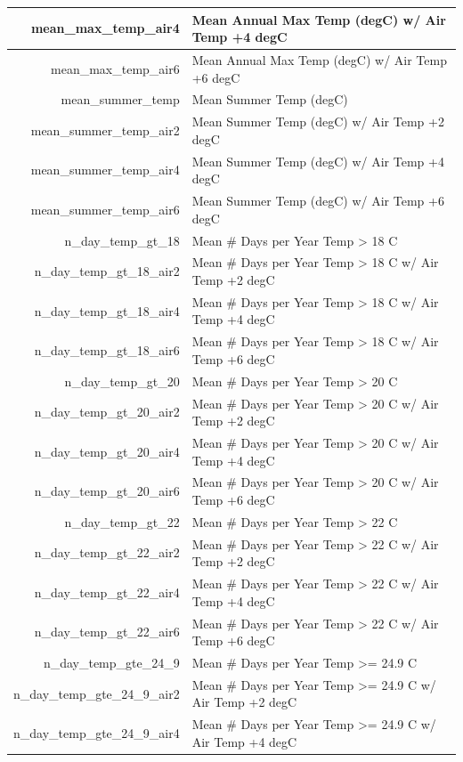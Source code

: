 \documentclass[]{book}
\begin{document}
\begin{tabular}{r|l}
\hline
mean\_max\_temp\_air4 & Mean Annual Max Temp (degC) w/ Air Temp +4 degC\\
\hline
mean\_max\_temp\_air6 & Mean Annual Max Temp (degC) w/ Air Temp +6 degC\\
\hline
mean\_summer\_temp & Mean Summer Temp (degC)\\
\hline
mean\_summer\_temp\_air2 & Mean Summer Temp (degC) w/ Air Temp +2 degC\\
\hline
mean\_summer\_temp\_air4 & Mean Summer Temp (degC) w/ Air Temp +4 degC\\
\hline
mean\_summer\_temp\_air6 & Mean Summer Temp (degC) w/ Air Temp +6 degC\\
\hline
n\_day\_temp\_gt\_18 & Mean \# Days per Year Temp > 18 C\\
\hline
n\_day\_temp\_gt\_18\_air2 & Mean \# Days per Year Temp > 18 C w/ Air Temp +2 degC\\
\hline
n\_day\_temp\_gt\_18\_air4 & Mean \# Days per Year Temp > 18 C w/ Air Temp +4 degC\\
\hline
n\_day\_temp\_gt\_18\_air6 & Mean \# Days per Year Temp > 18 C w/ Air Temp +6 degC\\
\hline
n\_day\_temp\_gt\_20 & Mean \# Days per Year Temp > 20 C\\
\hline
n\_day\_temp\_gt\_20\_air2 & Mean \# Days per Year Temp > 20 C w/ Air Temp +2 degC\\
\hline
n\_day\_temp\_gt\_20\_air4 & Mean \# Days per Year Temp > 20 C w/ Air Temp +4 degC\\
\hline
n\_day\_temp\_gt\_20\_air6 & Mean \# Days per Year Temp > 20 C w/ Air Temp +6 degC\\
\hline
n\_day\_temp\_gt\_22 & Mean \# Days per Year Temp > 22 C\\
\hline
n\_day\_temp\_gt\_22\_air2 & Mean \# Days per Year Temp > 22 C w/ Air Temp +2 degC\\
\hline
n\_day\_temp\_gt\_22\_air4 & Mean \# Days per Year Temp > 22 C w/ Air Temp +4 degC\\
\hline
n\_day\_temp\_gt\_22\_air6 & Mean \# Days per Year Temp > 22 C w/ Air Temp +6 degC\\
\hline
n\_day\_temp\_gte\_24\_9 & Mean \# Days per Year Temp >= 24.9 C\\
\hline
n\_day\_temp\_gte\_24\_9\_air2 & Mean \# Days per Year Temp >= 24.9 C w/ Air Temp +2 degC\\
\hline
n\_day\_temp\_gte\_24\_9\_air4 & Mean \# Days per Year Temp >= 24.9 C w/ Air Temp +4 degC\\
\hline

\end{tabular}
\end{document}
